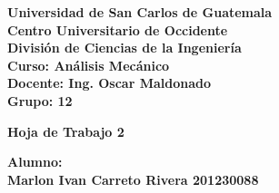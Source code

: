 \documentclass[12pt,letterpaper]{article}
\begin{document}
	
	\thispagestyle{empty}
	
	\begin{flushleft}
		\Large %
		\textbf{Universidad de San Carlos de Guatemala}\\
		\textbf{Centro Universitario de Occidente}\\
		\textbf{División de Ciencias de la Ingeniería}\\
		\textbf{Curso: Análisis Mecánico}\\
		\textbf{Docente: Ing. Oscar Maldonado}\\
		\textbf{Grupo: 12}
		
	\end{flushleft}
	
	\vspace*{5cm} 
	
	\begin{center}
		\Huge %
		\textbf{ Hoja de Trabajo 2 }
	\end{center}
	
	\vfill 
	
	\begin{flushright}
		\Large %
		\textbf{Alumno: \\ Marlon Ivan Carreto Rivera  201230088}
	\end{flushright}
	
	\vspace{1cm}
	
\end{document}
